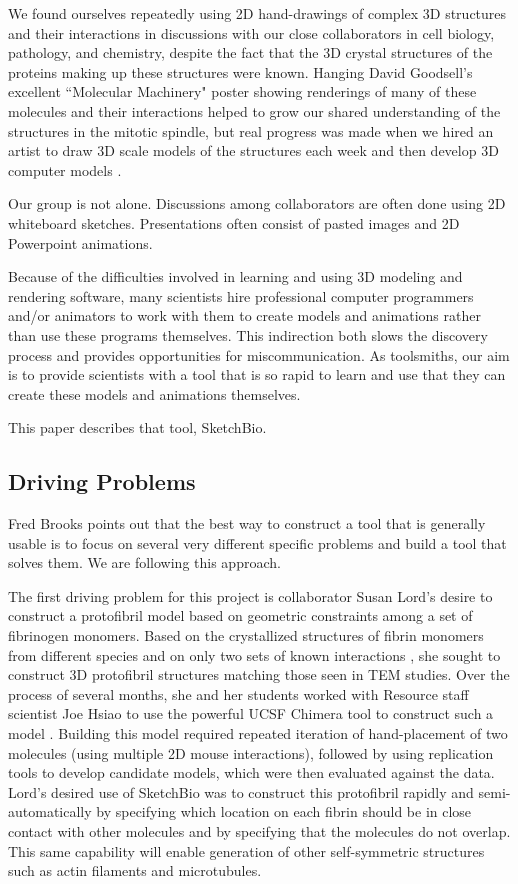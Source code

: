 \documentclass[twocolumn]{bmcart}%
\begin{document}
We found ourselves repeatedly using 2D hand-drawings of complex 3D structures and their interactions in discussions with our close collaborators in cell biology, pathology, and chemistry, despite the fact that the 3D crystal structures of the proteins making up these structures were known.  Hanging David Goodsell's excellent ``Molecular Machinery" poster \cite{Goodsell} showing renderings of many of these molecules and their interactions helped to grow our shared understanding of the structures in the mitotic spindle, but real progress was made when we hired an artist to draw 3D scale models of the structures each week and then develop 3D computer models \cite{taylor2012}.

Our group is not alone.  Discussions among collaborators are often done using 2D whiteboard sketches.  Presentations often consist of pasted images and 2D Powerpoint animations.

Because of the difficulties involved in learning and using 3D modeling and rendering software, many scientists hire professional computer programmers and/or animators to work with them to create models and animations rather than use these programs themselves.  This indirection both slows the discovery process and provides opportunities for miscommunication. As toolsmiths, our aim is to provide scientists with a tool that is so rapid to learn and use that they can create these models and animations themselves.

This paper describes that tool, SketchBio.

\subsection*{Driving Problems}
Fred Brooks points out that the best way to construct a tool that is generally usable is to focus on several very different specific problems and build a tool that solves them.  We are following this approach.

The first driving problem for this project is collaborator Susan Lord's desire to construct a protofibril model based on geometric constraints among a set of fibrinogen monomers.  Based on the crystallized structures of fibrin monomers from different species and on only two sets of known interactions \cite{lord2007fibrinogen}, she sought to construct 3D protofibril structures matching those seen in TEM studies.  Over the process of several months, she and her students worked with Resource staff scientist Joe Hsiao to use the powerful UCSF Chimera tool to construct such a model \cite{lordSubmitted}.  Building this model required repeated iteration of hand-placement of two molecules (using multiple 2D mouse interactions), followed by using replication tools to develop candidate models, which were then evaluated against the data.  Lord's desired use of SketchBio was to construct this protofibril rapidly and semi-automatically by specifying which location on each fibrin should be in close contact with other molecules and by specifying that the molecules do not overlap.  This same capability will enable generation of other self-symmetric structures such as actin filaments and microtubules.
\end{document}
